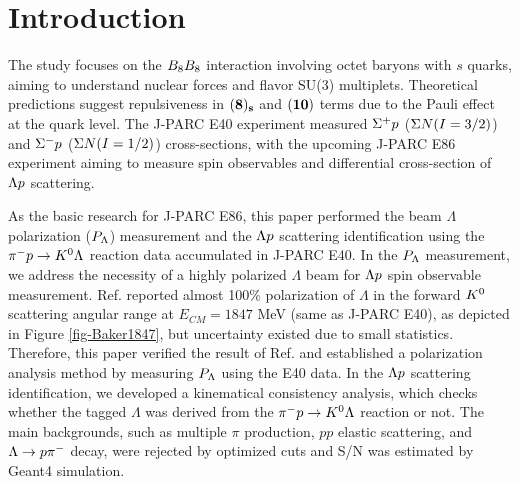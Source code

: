 \documentclass[a4paper,11pt,twoside,twocolumn]{article}
\begin{document}
\section{Introduction}
\label{sec-intro}

The study focuses on the $B_{8}B_{8}$ interaction involving octet baryons with $s$ quarks, aiming to understand nuclear forces and flavor SU(3) multiplets. Theoretical predictions suggest repulsiveness in ${\bf(8)_s}$ and ${\bf(10)}$ terms due to the Pauli effect at the quark level. The J-PARC E40 experiment measured $\Sigma^{+}p$ ($\Sigma N (I=3/2)$) and $\Sigma^{-}p$ ($\Sigma N (I=1/2)$) cross-sections, with the upcoming J-PARC E86 experiment aiming to measure spin observables and differential cross-section of $\Lambda p$ scattering. 

As the basic research for J-PARC E86, this paper performed the beam $\Lambda$ polarization ($P_{\Lambda}$) measurement and the $\Lambda p$ scattering identification using the $\pi^- p \to K^0 \Lambda$ reaction data accumulated in J-PARC E40. In the $P_{\Lambda}$ measurement, we address the necessity of a highly polarized $\Lambda$ beam for $\Lambda p$ spin observable measurement. Ref. \cite{Baker} reported almost 100\% polarization of $\Lambda$ in the forward $K^{0}$ scattering angular range at $E_{CM}=1847$ MeV (same as J-PARC E40), as depicted in Figure \ref{fig-Baker1847}, but uncertainty existed due to small statistics. Therefore, this paper verified the result of Ref. \cite{Baker} and established a polarization analysis method by measuring $P_{\Lambda}$ using the E40 data. In the $\Lambda p$ scattering identification, we developed a kinematical consistency analysis, which checks whether the tagged $\Lambda$ was derived from the $\pi^- p \to K^0 \Lambda$ reaction or not. The main backgrounds, such as multiple $\pi$ production, $pp$ elastic scattering, and $\Lambda\to p\pi^{-}$ decay, were rejected by optimized cuts and S/N was estimated by Geant4 simulation. 
\end{document}
